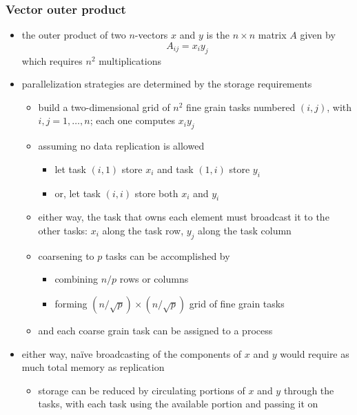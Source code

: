 \begin{frame}[fragile]
%
  \frametitle{Vector outer product}
%
  \begin{itemize}
%
  \item the outer product of two $n$-vectors $x$ and $y$ is the $n \times n$ matrix $A$ given
    by
    \begin{equation}
      A_{ij} = x_{i} y_{j}
    \end{equation}
    which requires $n^{2}$ multiplications
%
  \item parallelization strategies are determined by the storage requirements
    \begin{itemize}
    \item build a two-dimensional grid of $n^{2}$ fine grain tasks numbered $(i,j)$, with $i,j
      = 1, \ldots, n$; each one computes $x_{i}y_{j}$
    \item assuming no data replication is allowed
      \begin{itemize}
      \item let task $(i,1)$ store $x_{i}$ and task $(1,i)$ store $y_{i}$
      \item or, let task $(i,i)$ store both $x_{i}$ and $y_{i}$
      \end{itemize}
    \item either way, the task that owns each element must broadcast it to the other tasks:
      $x_{i}$ along the  task row, $y_{j}$ along the  task column
    \item coarsening to $p$ tasks can be accomplished by
      \begin{itemize}
      \item combining $n/p$ rows or columns
      \item forming $(n/\sqrt{p}) \times (n/\sqrt{p})$ grid of fine grain tasks
      \end{itemize}
    \item and each coarse grain task can be assigned to a process
    \end{itemize}
%
  \item either way, na\"ive broadcasting of the components of $x$ and $y$ would require as much
    total memory as replication
    \begin{itemize}
    \item storage can be reduced by circulating portions of $x$ and $y$ through the tasks, with
      each task using the available portion and passing it on
    \end{itemize}
%
  \end{itemize}
%
\end{frame}

